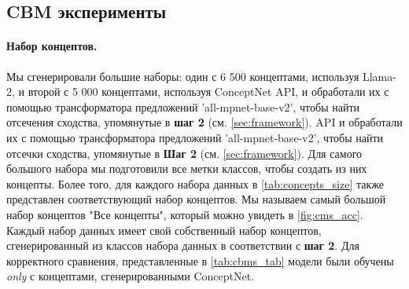 \subsection{CBM эксперименты}
\label{sec:cbmexp}

\paragraph{Набор концептов.} Мы сгенерировали большие наборы: один с 6 500 концептами, используя Llama-2, и второй с 5 000 концептами, используя ConceptNet \cite{article} API, и обработали их с помощью трансформатора предложений 'all-mpnet-base-v2', чтобы найти отсечения сходства, упомянутые в \textbf{шаг 2} (см. \cref{sec:framework}). API и обработали их с помощью трансформатора предложений 'all-mpnet-base-v2', чтобы найти отсечки сходства, упомянутые в \textbf{Шаг 2} (см. \cref{sec:framework}). Для самого большого набора мы подготовили все метки классов, чтобы создать из них концепты. Более того, для каждого набора данных в \cref{tab:concepts_size} также представлен соответствующий набор концептов. Мы называем самый большой набор концептов "Все концепты", который можно увидеть в \cref{fig:cms_acc}. Каждый набор данных имеет свой собственный набор концептов, сгенерированный из классов набора данных в соответствии с \textbf{шаг 2}. Для корректного сравнения, представленные в \cref{tab:cbms_tab} модели были обучены \textit{only} с концептами, сгенерированными ConceptNet.

